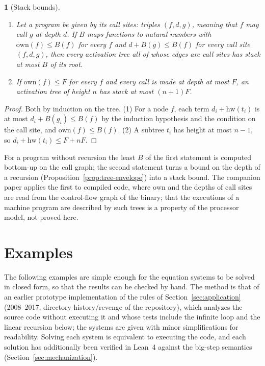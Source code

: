 \documentclass[oneside,english]{amsart}
\numberwithin{equation}{section}
\numberwithin{figure}{section}
\theoremstyle{plain}
\theoremstyle{definition}
\theoremstyle{plain}
\newtheorem{prop}[thm]{\protect\propositionname}
\theoremstyle{remark}
\theoremstyle{plain}
\theoremstyle{definition}
\theoremstyle{plain}
\theoremstyle{remark}
\newcommand{\lean}[1]{{\ttfamily\small #1}}
\providecommand{\propositionname}{Proposition}
\begin{document}
\begin{prop}[Stack bounds]
\label{prop:stack}
\begin{enumerate}
    \item Let a program be given by its call sites: triples $(f, d, g)$, meaning that $f$ may call $g$ at depth $d$. If $B$ maps functions to natural numbers with $\mathrm{own}(f) \le B(f)$ for every $f$ and $d + B(g) \le B(f)$ for every call site $(f, d, g)$, then every activation tree all of whose edges are call sites has stack at most $B$ of its root.
    \item If $\mathrm{own}(f) \le F$ for every $f$ and every call is made at depth at most $F$, an activation tree of height $n$ has stack at most $(n + 1) F$.
\end{enumerate}
\end{prop}

\begin{proof}
Both by induction on the tree. (1) For a node $f$, each term $d_i + \mathrm{hw}(t_i)$ is at most $d_i + B(g_i) \le B(f)$ by the induction hypothesis and the condition on the call site, and $\mathrm{own}(f) \le B(f)$. (2) A subtree $t_i$ has height at most $n - 1$, so $d_i + \mathrm{hw}(t_i) \le F + n F$.
\end{proof}

For a program without recursion the least $B$ of the first statement is computed bottom-up on the call graph; the second statement turns a bound on the depth of a recursion (Proposition~\ref{prop:tree-envelope}) into a stack bound. The companion paper applies the first to compiled code, where $\mathrm{own}$ and the depths of call sites are read from the control-flow graph of the binary; that the executions of a machine program are described by such trees is a property of the processor model, not proved here.

\section{Examples}
\label{sec:examples}

The following examples are simple enough for the equation systems to be solved in closed form, so that the results can be checked by hand. The method is that of an earlier prototype implementation of the rules of Section~\ref{sec:application} (2008--2017, directory \lean{history/revenge} of the repository), which analyzes the source code without executing it and whose tests include the infinite loop and the linear recursion below; the systems are given with minor simplifications for readability. Solving each system is equivalent to executing the code, and each solution has additionally been verified in Lean~4 against the big-step semantics (Section~\ref{sec:mechanization}).
\end{document}

